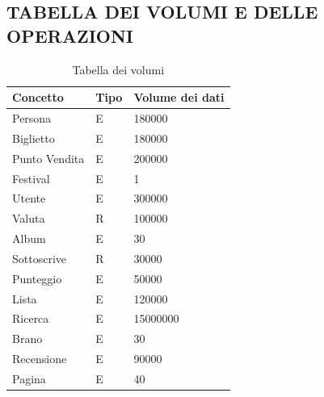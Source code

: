 \documentclass{article}
\begin{document}
\subsection{TABELLA DEI VOLUMI E DELLE OPERAZIONI}
\begin{table}[ht]
    \centering
        \begin{tabular}{|p{3cm}|p{0.75cm}|p{3cm}|}
         \hline
         \textbf{Concetto}&\textbf{Tipo}  &\textbf{Volume dei dati} \\
         \hline
         
         Persona&E  &180000 \\
         \hline
         Biglietto&E  &180000 \\
         \hline
         Punto Vendita& E &200000 \\
         \hline
         Festival&E  &1 \\
         \hline
         Utente&E  &300000 \\
         \hline
         Valuta & R &100000 \\
         \hline
         Album&E  &30 \\
         \hline
         Sottoscrive&R  &30000 \\
         \hline
         Punteggio&E  &50000 \\
         \hline
         Lista&E  &120000 \\
         \hline
         Ricerca&E  &15000000 \\
         \hline
         Brano&E  &30 \\
         \hline
         Recensione&E  &90000 \\
         \hline
         Pagina&E  &40 \\
         \hline
    \end{tabular}
    \caption{Tabella dei volumi}
    \label{tab:my_label}
\end{table}
\end{document}
